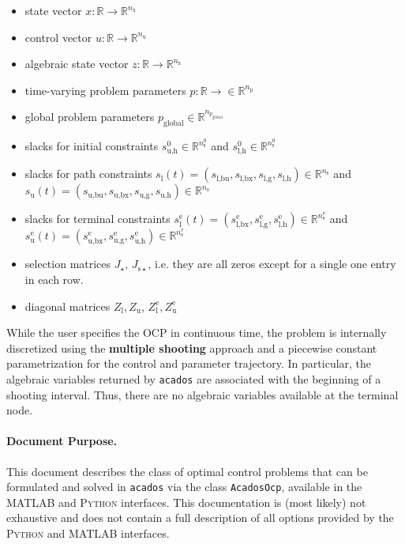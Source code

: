 \documentclass[english]{article}
\newcommand{\acados}{\texttt{acados}}
\newcommand{\matlab}{\textsc{MATLAB}}
\newcommand{\python}{\textsc{Python}}
\newcommand{\ind}[1]{_{\textrm{#1}}}
\newcommand{\terminal}{^{\textrm{e}}}
\newcommand{\initial}{^{\textrm{0}}}
\newcommand{\glob}{_{\textrm{global}}}
\newcommand{\Lower}{\ind{l}}
\newcommand{\lowerh}{\ind{l,h}}
\newcommand{\lowerbx}{\ind{l,bx}}
\newcommand{\lowerbu}{\ind{l,bu}}
\newcommand{\lowerg}{\ind{l,g}}
\newcommand{\upper}{\ind{u}}
\newcommand{\upperh}{\ind{u,h}}
\newcommand{\upperbx}{\ind{u,bx}}
\newcommand{\upperbu}{\ind{u,bu}}
\newcommand{\upperg}{\ind{u,g}}
\newcommand{\R}{\mathbb{R}}
\newcommand{\nx}{n\ind{x}}
\newcommand{\nuu}{n\ind{u}}
\newcommand{\nz}{n\ind{z}}
\newcommand{\np}{n\ind{p}}
\newcommand{\ns}{n\ind{s}}
\begin{document}
\begin{itemize}
\item state vector $ x: \R \rightarrow \R^{\nx} $
\item control vector $ u: \R \rightarrow \R^{\nuu} $
\item algebraic state vector $ z: \R \rightarrow \R^{\nz} $
\item time-varying problem parameters $ p: \R \rightarrow \in \R^{\np}$
\item global problem parameters $p\glob  \in \R^{n_{p\glob}}$
\item slacks for initial constraints $s\ind{u,h}\initial \in \R^{\ns\initial}$ and $s\ind{l,h}\initial \in \R^{\ns\initial}$
\item slacks for path constraints $ s\Lower(t) = (s\lowerbu, s\lowerbx, s\lowerg, s\lowerh) \in \R^{\ns} $ and $ s\upper(t) = (s\upperbu, s\upperbx, s\upperg, s\upperh) \in \R^{\ns} $
\item slacks for terminal constraints $ s\Lower\terminal(t) = (s\lowerbx\terminal, s\lowerg\terminal, s\lowerh\terminal) \in \R^{\ns\terminal} $ and $ s\upper\terminal(t) = (s\upperbx\terminal, s\upperg\terminal, s\upperh\terminal) \in \R^{\ns\terminal} $
\item selection matrices $J_{\star}$, $J_{\mathrm{s}\star}$, i.e. they are all zeros except for a single one entry in each row.
\item diagonal matrices $Z\ind{l}, Z\ind{u}$, $Z\ind{l}\terminal, Z\ind{u}\terminal$
\end{itemize}

While the user specifies the OCP in continuous time, the problem is internally discretized using the \textbf{multiple shooting} approach and a piecewise constant parametrization for the control and parameter trajectory.
In particular, the algebraic variables returned by \acados{} are associated with the beginning of a shooting interval.
Thus, there are no algebraic variables available at the terminal node.

%

%
\paragraph{Document Purpose.}
This document describes the class of optimal control problems that can be formulated and solved in \acados{} via the class \texttt{AcadosOcp}, available in the \matlab{} and \python{} interfaces.
This documentation is (most likely) not exhaustive and does not contain a full description of all options provided by the \python{} and \matlab{} interfaces.
\end{document}
